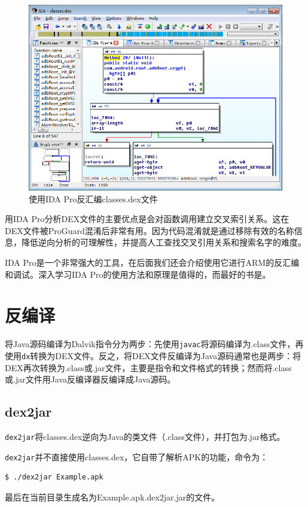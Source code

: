 \begin{figure}[htbp]
  \centering
  \includegraphics[width=14cm]{image/ida-dex.png}
  \caption{使用IDA Pro反汇编classes.dex文件}
  \label{Fig:ida-dex}
\end{figure}

用IDA Pro分析DEX文件的主要优点是会对函数调用建立交叉索引关系。这在DEX文件被ProGuard混淆后非常有用。因为代码混淆就是通过移除有效的名称信息，降低逆向分析的可理解性，并提高人工查找交叉引用关系和搜索名字的难度。

IDA Pro是一个非常强大的工具，在后面我们还会介绍使用它进行ARM的反汇编和调试。深入学习IDA Pro的使用方法和原理是值得的，而最好的书是\cite{ida_pro}。

\section{反编译}
将Java源码编译为Dalvik指令分为两步：先使用\lstinline!javac!将源码编译为.class文件，再使用\lstinline!dx!转换为DEX文件。反之，将DEX文件反编译为Java源码通常也是两步：将DEX再次转换为.class或.jar文件，主要是指令和文件格式的转换；然而将.class或.jar文件用Java反编译器反编译成Java源码。

\subsection{dex2jar}
\lstinline!dex2jar!\cite{url:dex2jar}将classes.dex逆向为Java的类文件（.class文件），并打包为.jar格式。

\lstinline!dex2jar!并不直接使用classes.dex，它自带了解析APK的功能，命令为：
\begin{lstlisting}[language=bash, numbers=none]
 $ ./dex2jar Example.apk
\end{lstlisting}
最后在当前目录生成名为Example.apk.dex2jar.jar的文件。

